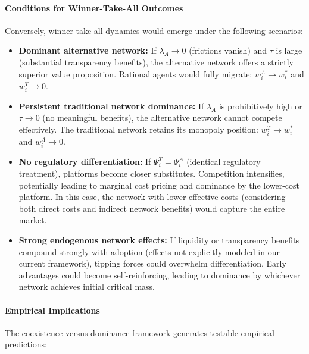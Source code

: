 \paragraph{Conditions for Winner-Take-All Outcomes}

Conversely, winner-take-all dynamics would emerge under the following scenarios:

\begin{itemize}
    \item \textbf{Dominant alternative network:} If $\lambda_A \to 0$ (frictions vanish) and $\tau$ is large (substantial transparency benefits), the alternative network offers a strictly superior value proposition. Rational agents would fully migrate: $w_i^A \to w_i^*$ and $w_i^T \to 0$.
    
    \item \textbf{Persistent traditional network dominance:} If $\lambda_A$ is prohibitively high or $\tau \to 0$ (no meaningful benefits), the alternative network cannot compete effectively. The traditional network retains its monopoly position: $w_i^T \to w_i^*$ and $w_i^A \to 0$.
    
    \item \textbf{No regulatory differentiation:} If $\Psi_i^T = \Psi_i^A$ (identical regulatory treatment), platforms become closer substitutes. Competition intensifies, potentially leading to marginal cost pricing and dominance by the lower-cost platform. In this case, the network with lower effective costs (considering both direct costs and indirect network benefits) would capture the entire market.
    
    \item \textbf{Strong endogenous network effects:} If liquidity or transparency benefits compound strongly with adoption (effects not explicitly modeled in our current framework), tipping forces could overwhelm differentiation. Early advantages could become self-reinforcing, leading to dominance by whichever network achieves initial critical mass.
\end{itemize}

\paragraph{Empirical Implications}

The coexistence-versus-dominance framework generates testable empirical predictions:

